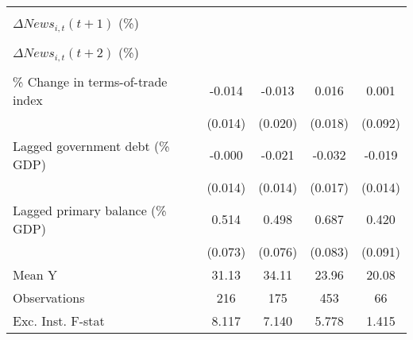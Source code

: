{\begin{tabular}{l*{4}{c}}
                    &                     &                     &                     &                     \\
\addlinespace
$ \Delta News_{i,t}(t+1)$ (\%)&                     &                     &                     &                     \\
                    &                     &                     &                     &                     \\
\addlinespace
$ \Delta News_{i,t}(t+2)$ (\%)&                     &                     &                     &                     \\
                    &                     &                     &                     &                     \\
\addlinespace
\% Change in terms-of-trade index&      -0.014         &      -0.013         &       0.016         &       0.001         \\
                    &     (0.014)         &     (0.020)         &     (0.018)         &     (0.092)         \\
\addlinespace
Lagged government debt (\% GDP)&      -0.000         &      -0.021         &      -0.032\sym{*}  &      -0.019         \\
                    &     (0.014)         &     (0.014)         &     (0.017)         &     (0.014)         \\
\addlinespace
Lagged primary balance (\% GDP)&       0.514\sym{***}&       0.498\sym{***}&       0.687\sym{***}&       0.420\sym{***}\\
                    &     (0.073)         &     (0.076)         &     (0.083)         &     (0.091)         \\
\midrule
Mean Y              &       31.13         &       34.11         &       23.96         &       20.08         \\
Observations        &         216         &         175         &         453         &          66         \\
Exc. Inst. F-stat   &       8.117         &       7.140         &       5.778         &       1.415         \\
\bottomrule
\end{tabular}
}
